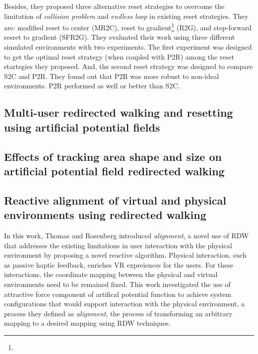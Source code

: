 \documentclass[12pt]{article}
\begin{document}
Besides, they proposed three alternative reset strategies to overcome the limitation of \emph{collision problem} and \emph{endless loop} in existing reset strategies. They are: modified reset to center (MR2C), reset to gradient\footnote{\fnoteGrad} (R2G), and step-forward resret to gradient (SFR2G). They evaluated their work using three different simulated environments with two experiments. The first experiment was designed to get the optimal reset strategy (when coupled with P2R) among the reset startegies they proposed. And, the second reset strategy was designed to compare S2C and P2R. They found out that P2R was more robust to non-ideal environments. P2R performed as well or better than S2C.

\subsection{Multi-user redirected walking and resetting using artificial potential fields}
\textbf{\cite{bachmann2019multi}}



\subsection{Effects of tracking area shape and size on artificial potential field redirected walking}
\textbf{\cite{messinger2019effects}}



\subsection{Reactive alignment of virtual and physical environments using redirected walking}
\textbf{\cite{thomas2020reactive}}

In this work, Thomas and Rosenberg introduced \emph{alignment}, a novel use of RDW that addresses the existing limitations in user interaction with the physical environment by proposing a novel reactive algorithm. Physical interaction, such as passive haptic feedback, enriches VR expreiences for the users. For these interactions, the coordinate mapping between the physical and virtual environments need to be remained fixed. This work investigated the use of attractive force component of artifical potential function to achieve system configurations that would support interaction with the physical environment, a process they defined as \emph{alignment}, the process of transforming an arbitrary mapping to a desired mapping using RDW techniques.
\end{document}
